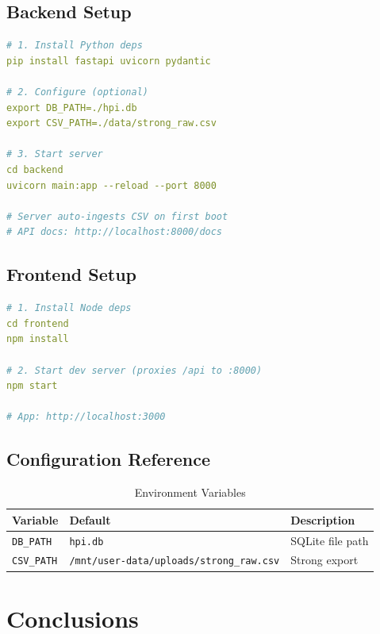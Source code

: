 \documentclass[12pt,a4paper]{report}
\begin{document}
\section{Backend Setup}

\begin{lstlisting}[language=yaml,caption=Backend startup]
# 1. Install Python deps
pip install fastapi uvicorn pydantic

# 2. Configure (optional)
export DB_PATH=./hpi.db
export CSV_PATH=./data/strong_raw.csv

# 3. Start server
cd backend
uvicorn main:app --reload --port 8000

# Server auto-ingests CSV on first boot
# API docs: http://localhost:8000/docs
\end{lstlisting}

\section{Frontend Setup}

\begin{lstlisting}[language=yaml,caption=Frontend startup]
# 1. Install Node deps
cd frontend
npm install

# 2. Start dev server (proxies /api to :8000)
npm start

# App: http://localhost:3000
\end{lstlisting}

\section{Configuration Reference}

\begin{table}[h!]
\centering
\caption{Environment Variables}
\begin{tabular}{lll}
\toprule
\textbf{Variable} & \textbf{Default} & \textbf{Description} \\
\midrule
\texttt{DB\_PATH}  & \texttt{hpi.db} & SQLite file path \\
\texttt{CSV\_PATH} & \texttt{/mnt/user-data/uploads/strong\_raw.csv} & Strong export \\
\bottomrule
\end{tabular}
\end{table}

\chapter*{Conclusions}
\end{document}
